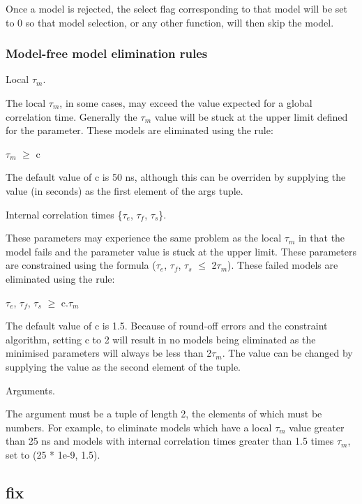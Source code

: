 Once a model is rejected, the select flag corresponding to that model will be set to 0 so
that model selection, or any other function, will then skip the model.



\subsubsection{Model-free model elimination rules}

Local $\tau_m$.

The local $\tau_m$, in some cases, may exceed the value expected for a global correlation time.
Generally the $\tau_m$ value will be stuck at the upper limit defined for the parameter.  These
models are eliminated using the rule:

    $\tau_m$ $\ge$ c

The default value of c is 50 ns, although this can be overriden by supplying the value (in
seconds) as the first element of the args tuple.


Internal correlation times \{$\tau_e$, $\tau_f$, $\tau_s$\}.

These parameters may experience the same problem as the local $\tau_m$ in that the model fails and
the parameter value is stuck at the upper limit.  These parameters are constrained using the
formula ($\tau_e$, $\tau_f$, $\tau_s$ $\le$ 2$\tau_m$).  These failed models are eliminated using the rule:

    $\tau_e$, $\tau_f$, $\tau_s$ $\ge$ c.$\tau_m$

The default value of c is 1.5.  Because of round-off errors and the constraint algorithm,
setting c to 2 will result in no models being eliminated as the minimised parameters will
always be less than 2$\tau_m$.  The value can be changed by supplying the value as the second
element of the tuple.


Arguments.

The 
 argument must be a tuple of length 2, the elements of which must be numbers.  For
example, to eliminate models which have a local $\tau_m$ value greater than 25 ns and models with
internal correlation times greater than 1.5 times $\tau_m$, set 
 to (25 * 1e-9, 1.5).


\newpage

\subsection{fix}


